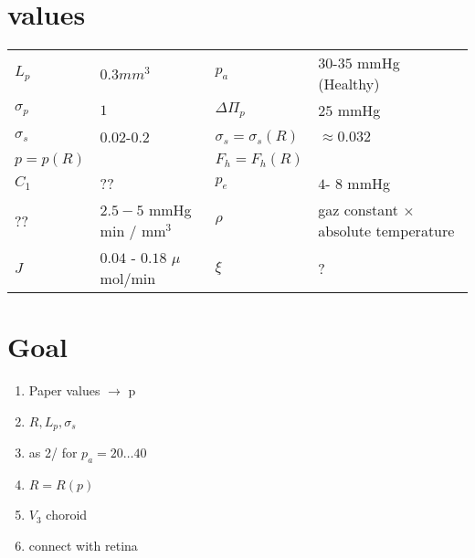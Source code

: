 \documentclass[11pt]{article}
\begin{document}
\section{values}
\begin{tabular}{|l|l||l|l|}
 \hline
$ L_p $ &$0.3 mm^ 3$&$p_a$&  $30$-$35$ mmHg (Healthy)\\

$\sigma_p$& $ 1$& $\Delta \Pi_p$&$25$ mmHg\\

$\sigma_s$& $0.02$-$0.2$& $\sigma_s =  \sigma_s (R)$& $\approx 0.032$\\

$p = p(R)$&& $F_h = F_h(R)$&\\

$C_1 $& ??& $p_e$& $ 4 $- $8$ mmHg\\

?? & $2.5 - 5$ mmHg min / mm$^3$
& $\rho$& gaz constant $ \times$ absolute temperature \\

$J$ & $0.04$ - $0.18$  $\mu$ mol/min

&$\xi$&?\\
\hline
\end{tabular}
\section{Goal}
\begin{enumerate}
\item Paper values $\rightarrow$ p
\item $R,L_p,\sigma_s$
\item as 2/ for $p_a = 20 \ldots 40$ 
\item $R = R(p)$
\item $V_3$ choroid
\item connect with retina
\end{enumerate}
\end{document}
